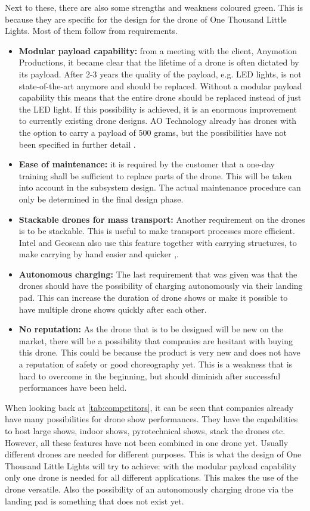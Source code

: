 Next to these, there are also some strengths and weakness coloured green. This is because they are specific for the design for the drone of One Thousand Little Lights. Most of them follow from requirements. 
\begin{itemize}[noitemsep, nolistsep]
     \item \textbf{Modular payload capability:} from a meeting with the client, Anymotion Productions, it became clear that the lifetime of a drone is often dictated by its payload. After 2-3 years the quality of the payload, e.g. LED lights, is not state-of-the-art anymore and should be replaced. Without a modular payload capability this means that the entire drone should be replaced instead of just the LED light. If this possibility is achieved, it is an enormous improvement to currently existing drone designs.
     AO Technology already has drones with the option to carry a payload of 500 grams, but the possibilities have not been specified in further detail \cite{AOtech}. 
     \item \textbf{Ease of maintenance:} it is required by the customer that a one-day training shall be sufficient to replace parts of the drone. This will be taken into account in the subsystem design. The actual maintenance procedure can only be determined in the final design phase. 
     \item \textbf{Stackable drones for mass transport:} Another requirement on the drones is to be stackable. This is useful to make transport processes more efficient. Intel and Geoscan also use this feature together with carrying structures, to make carrying by hand easier and quicker \cite{intel},\cite{geoscan}. 
     \item \textbf{Autonomous charging:} The last requirement that was given was that the drones should have the possibility of charging autonomously via their landing pad. This can increase the duration of drone shows or make it possible to have multiple drone shows quickly after each other.
    \item \textbf{No reputation:} As the drone that is to be designed will be new on the market, there will be a possibility that companies are hesitant with buying this drone. This could be because the product is very new and does not have a reputation of safety or good choreography yet. This is a weakness that is hard to overcome in the beginning, but should diminish after successful performances have been held.   
    \end{itemize}

When looking back at \autoref{tab:competitors}, it can be seen that companies already have many possibilities for drone show performances. They have the capabilities to host large shows, indoor shows, pyrotechnical shows, stack the drones etc. However, all these features have not been combined in one drone yet. Usually different drones are needed for different purposes. This is what the design of One Thousand Little Lights will try to achieve: with the modular payload capability only one drone is needed for all different applications. This makes the use of the drone versatile. Also the possibility of an autonomously charging drone via the landing pad is something that does not exist yet. 

